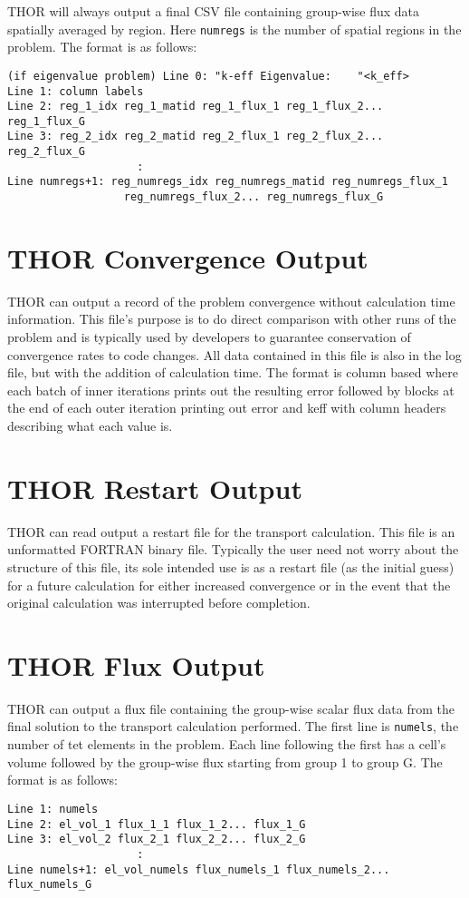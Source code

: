 \ac{THOR} will always output a final CSV file containing group-wise flux data spatially averaged by region.
Here \verb"numregs" is the number of spatial regions in the problem.
The format is as follows:
\begin{verbatim}
(if eigenvalue problem) Line 0: "k-eff Eigenvalue:    "<k_eff>
Line 1: column labels
Line 2: reg_1_idx reg_1_matid reg_1_flux_1 reg_1_flux_2... reg_1_flux_G
Line 3: reg_2_idx reg_2_matid reg_2_flux_1 reg_2_flux_2... reg_2_flux_G
                    :
Line numregs+1: reg_numregs_idx reg_numregs_matid reg_numregs_flux_1
                  reg_numregs_flux_2... reg_numregs_flux_G
\end{verbatim}

\section{THOR Convergence Output}\label{ch:out:sec:conv}

\ac{THOR} can output a record of the problem convergence without calculation time information.
This file's purpose is to do direct comparison with other runs of the problem and is typically used by developers to guarantee conservation of convergence rates to code changes.
All data contained in this file is also in the log file, but with the addition of calculation time.
The format is column based where each batch of inner iterations prints out the resulting error followed by blocks at the end of each outer iteration printing out error and keff with column headers describing what each value is.

\section{THOR Restart Output}\label{ch:out:sec:restart}

\ac{THOR} can read output a restart file for the transport calculation.
This file is an unformatted FORTRAN binary file.
Typically the user need not worry about the structure of this file, its sole intended use is as a restart file (as the initial guess) for a future calculation for either increased convergence or in the event that the original calculation was interrupted before completion.

\section{THOR Flux Output}\label{ch:out:sec:flux}

\ac{THOR} can output a flux file containing the group-wise scalar flux data from the final solution to the transport calculation performed.
The first line is \verb"numels", the number of tet elements in the problem.
Each line following the first has a cell's volume followed by the group-wise flux starting from group 1 to group G.
The format is as follows:
\begin{verbatim}
Line 1: numels
Line 2: el_vol_1 flux_1_1 flux_1_2... flux_1_G
Line 3: el_vol_2 flux_2_1 flux_2_2... flux_2_G
                    :
Line numels+1: el_vol_numels flux_numels_1 flux_numels_2... flux_numels_G
\end{verbatim}

